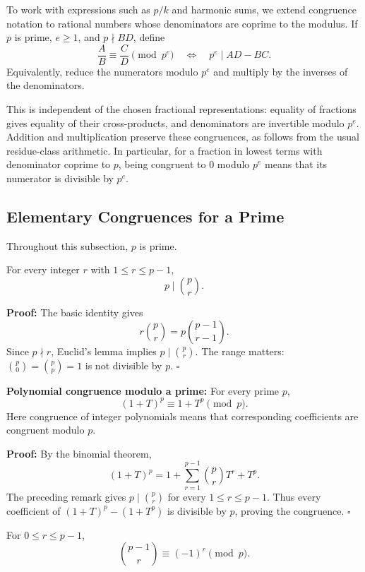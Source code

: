\documentclass[a4paper,11pt,abstracton]{scrartcl}
\theoremstyle{dotlessP}
\theoremstyle{dotlessS}
\theoremstyle{remark}
\theoremstyle{definition}
\begin{document}
\begin{definition_box}
To work with expressions such as $p/k$ and harmonic sums, we extend congruence notation to rational
numbers whose denominators are coprime to the modulus.
If $p$ is prime, $e\geq1$, and $p\nmid BD$, define
\[
    \frac AB\equiv\frac CD\pmod{p^e}
    \quad\Longleftrightarrow\quad p^e\mid AD-BC.
\]
Equivalently, reduce the numerators modulo $p^e$ and multiply by the
inverses of the denominators.
\end{definition_box}
 This is independent of the chosen
fractional representations: equality of fractions gives equality of
their cross-products, and denominators are invertible modulo $p^e$.
Addition and multiplication preserve these congruences, as follows
from the usual residue-class arithmetic.
In particular, for a fraction in lowest terms with denominator coprime
to $p$, being congruent to $0$ modulo $p^e$ means that its numerator
is divisible by $p^e$.

\subsection{Elementary Congruences for a Prime}

Throughout this subsection, $p$ is prime.

\begin{remark_box}{}
For every integer $r$ with $1\leq r\leq p-1$,
\[
    \boxed{p\mid\binom pr.}
\]
\end{remark_box}

\textbf{Proof:}
The basic identity gives
\[
    r\binom pr=p\binom{p-1}{r-1}.
\]
Since $p\nmid r$, Euclid's lemma implies $p\mid\binom pr$.
The range matters: $\binom p0=\binom pp=1$ is not divisible by $p$.
\hfill$\square$


\begin{remark_box}
\textbf{Polynomial congruence modulo a prime:}
For every prime $p$,
\[
    (1+T)^p\equiv1+T^p\pmod p.
\]
Here congruence of integer polynomials means that corresponding
coefficients are congruent modulo $p$.
\end{remark_box}

\textbf{Proof:}
By the binomial theorem,
\[
    (1+T)^p=1+\sum_{r=1}^{p-1}\binom pr T^r+T^p.
\]
The preceding remark gives $p\mid\binom pr$ for every
$1\leq r\leq p-1$. Thus every coefficient of
$(1+T)^p-(1+T^p)$ is divisible by $p$, proving the congruence.
\hfill$\square$


\begin{remark_box}
For $0\leq r\leq p-1$,
\[
    \boxed{\binom{p-1}r\equiv(-1)^r\pmod p.}
\]
\end{remark_box}
\end{document}
